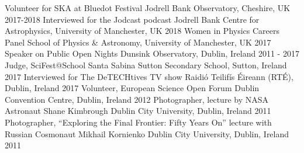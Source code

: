 \begin{cvpress}
   \cvpres
   {Volunteer for SKA at Bluedot Festival}
    {Jodrell Bank Observatory, Cheshire, UK}
    {2017-2018}
   \cvpres
   {Interviewed for the Jodcast podcast}
    {Jodrell Bank Centre for Astrophysics, University of Manchester, UK}
    {2018}
   \cvpres
   {Women in Physics Careers Panel}
    {School of Physics \& Astronomy, University of Manchester, UK}
    {2017}
   \cvpres
   {Speaker on Public Open Nights}
    {Dunsink Observatory, Dublin, Ireland}
    {2011 - 2017}
   \cvpres
   {Judge, SciFest@School}
    {Santa Sabina Sutton Secondary School, Sutton, Ireland}
    {2017}
   \cvpres
   {Interviewed for The DeTECHtives TV show}
    {Raidi{\'o} Teilif{\'i}s {\'E}ireann (RT{\'E}), Dublin, Ireland}
    {2017}
   \cvpres
   {Volunteer, European Science Open Forum}
    {Dublin Convention Centre, Dublin, Ireland}
    {2012}
   \cvpres
   	{Photographer, lecture by NASA Astronaut Shane Kimbrough}
    {Dublin City University, Dublin, Ireland}
    {2011}
   \cvpres
   	{Photographer, ``Exploring the Final Frontier: Fifty Years On'' lecture with Russian Cosmonaut Mikhail Kornienko}
    {Dublin City University, Dublin, Ireland}
    {2011}
\end{cvpress}


